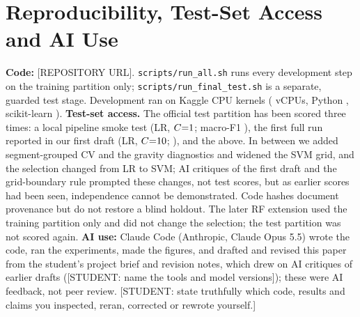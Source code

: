 \documentclass{article}
\begin{document}
\section{Reproducibility, Test-Set Access and AI Use}
\label{sec:repro}
\textbf{Code:} [REPOSITORY URL]. \texttt{scripts/run\_all.sh} runs every development step on the training partition only; \texttt{scripts/run\_final\_test.sh} is a separate, guarded test stage. Development ran on Kaggle CPU kernels (\Nncpu{} vCPUs, Python \Npyver, scikit-learn \Nsklearn).
\textbf{Test-set access.} The official test partition has been scored three times: a local pipeline smoke test (LR, $C{=}1$; macro-F1 \Nsmoketestf), the first full run reported in our first draft (LR, $C{=}10$; \Nrunonetestf), and the \Nselmodel{} above. In between we added segment-grouped CV and the gravity diagnostics and widened the SVM grid, and the selection changed from LR to SVM; AI critiques of the first draft and the grid-boundary rule prompted these changes, not test scores, but as earlier scores had been seen, independence cannot be demonstrated. Code hashes document provenance but do not restore a blind holdout. The later RF extension used the training partition only and did not change the selection; the test partition was not scored again.
\textbf{AI use:} Claude Code (Anthropic, Claude Opus 5.5) wrote the code, ran the experiments, made the figures, and drafted and revised this paper from the student's project brief and revision notes, which drew on AI critiques of earlier drafts ([STUDENT: name the tools and model versions]); these were AI feedback, not peer review. [STUDENT: state truthfully which code, results and claims you inspected, reran, corrected or rewrote yourself.]
\end{document}
